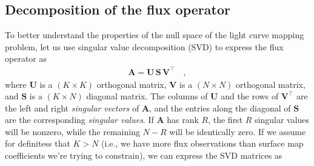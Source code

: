 \documentclass[modern]{aastex62}
\begin{document}
\subsection{Decomposition of the flux operator}
%
To better understand the properties of the null space of the light curve
mapping problem, let
%
us use singular value decomposition (SVD) to express
the flux operator as
%
\begin{align}
    \mathbf{A} = \mathbf{U} \, \mathbf{S} \, \mathbf{V}^\top
    \quad,
\end{align}
%
where $\mathbf{U}$ is a $(K \times K)$ orthogonal matrix,
$\mathbf{V}$ is a $(N \times N)$ orthogonal matrix,
and $\mathbf{S}$ is a $(K \times N)$ diagonal matrix.
%
The columns of $\mathbf{U}$ and the rows of $\mathbf{V}^\top$ are the left and right
\emph{singular vectors} of $\mathbf{A}$, and the entries along the
diagonal of $\mathbf{S}$ are the corresponding \emph{singular values}. If $\mathbf{A}$
has rank $R$, the first $R$ singular values will be nonzero, while the
remaining $N - R$ will be identically zero.
If we assume for definitess that $K > N$ (i.e., we have more flux observations
than surface map coefficients we're trying to constrain), we can express the
SVD matrices as
%
\end{document}
